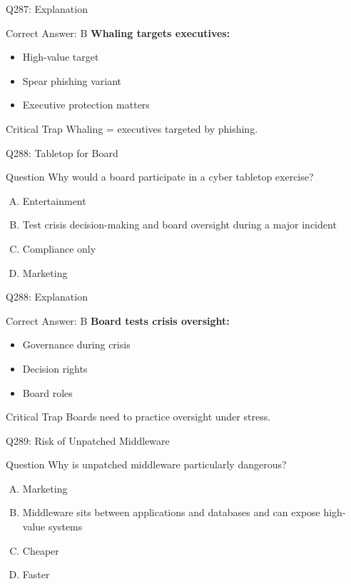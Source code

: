 \documentclass{beamer}
\begin{document}
	\begin{frame}{Q287: Explanation}
		\begin{block}{Correct Answer: B}
			\textbf{Whaling targets executives:}
			\begin{itemize}
				\item High-value target
				\item Spear phishing variant
				\item Executive protection matters
			\end{itemize}
		\end{block}
		\begin{alertblock}{Critical Trap}
			Whaling = executives targeted by phishing.
		\end{alertblock}
	\end{frame}
	
	\begin{frame}{Q288: Tabletop for Board}
		\begin{block}{Question}
			Why would a board participate in a cyber tabletop exercise?
		\end{block}
		\begin{enumerate}[(A)]
			\item Entertainment
			\item Test crisis decision-making and board oversight during a major incident
			\item Compliance only
			\item Marketing
		\end{enumerate}
	\end{frame}
	
	\begin{frame}{Q288: Explanation}
		\begin{block}{Correct Answer: B}
			\textbf{Board tests crisis oversight:}
			\begin{itemize}
				\item Governance during crisis
				\item Decision rights
				\item Board roles
			\end{itemize}
		\end{block}
		\begin{alertblock}{Critical Trap}
			Boards need to practice oversight under stress.
		\end{alertblock}
	\end{frame}
	
	\begin{frame}{Q289: Risk of Unpatched Middleware}
		\begin{block}{Question}
			Why is unpatched middleware particularly dangerous?
		\end{block}
		\begin{enumerate}[(A)]
			\item Marketing
			\item Middleware sits between applications and databases and can expose high-value systems
			\item Cheaper
			\item Faster
		\end{enumerate}
	\end{frame}
	
\end{document}
